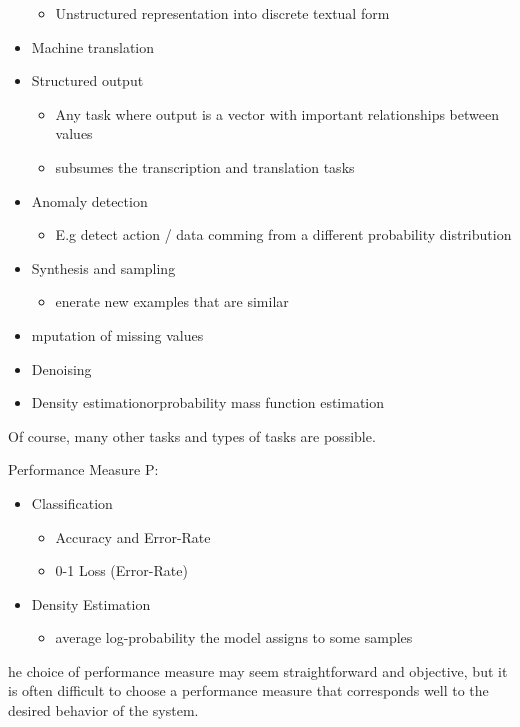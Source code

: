 \documentclass[../Main.tex]{subfiles}
\begin{document}
\begin{itemize}
\begin{itemize}
            \item Unstructured representation into discrete textual form
        \end{itemize}
    \item Machine translation
    \item Structured output
        \begin{itemize}
            \item Any task where output is a vector with important relationships between values
            \item subsumes the transcription and translation tasks
        \end{itemize}
    \item Anomaly detection
        \begin{itemize}
            \item E.g detect action / data comming from a different probability distribution
        \end{itemize}
    \item Synthesis and sampling
        \begin{itemize}
            \item enerate new examples that are similar
        \end{itemize}
    \item mputation of missing values
    \item Denoising
    \item Density estimationorprobability mass function estimation
\end{itemize}
Of course, many other tasks and types of tasks are possible.

Performance Measure P:
\begin{itemize}
    \item Classification
        \begin{itemize}
            \item Accuracy and Error-Rate
            \item 0-1 Loss (Error-Rate)
        \end{itemize}
    \item Density Estimation
        \begin{itemize}
            \item average log-probability the model assigns to some samples
        \end{itemize}
\end{itemize}
he choice of performance measure may seem straightforward
and objective, but it is often diﬃcult to choose a performance 
measure that corresponds well to the desired behavior of the system.
\end{document}
